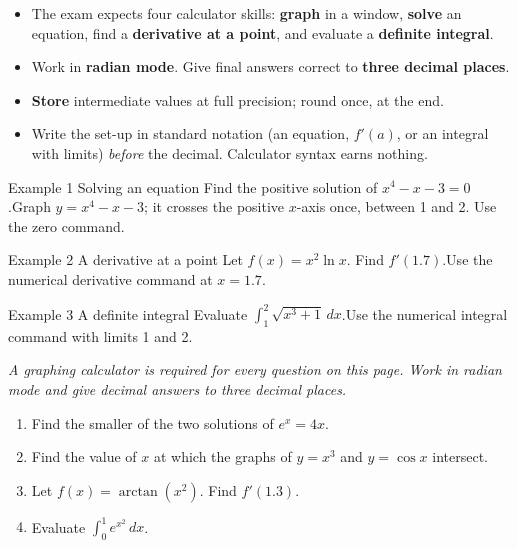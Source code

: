 \documentclass[11pt]{article}
\begin{document}

\begin{ideabox}
\begin{itemize}[leftmargin=*,itemsep=2pt,topsep=2pt]
  \item The exam expects four calculator skills: \textbf{graph} in a window, \textbf{solve} an equation, find a \textbf{derivative at a point}, and evaluate a \textbf{definite integral}.
  \item Work in \textbf{radian mode}. Give final answers correct to \textbf{three decimal places}.
  \item \textbf{Store} intermediate values at full precision; round once, at the end.
  \item Write the set-up in standard notation (an equation, $f'(a)$, or an integral with limits) \emph{before} the decimal. Calculator syntax earns nothing.
\end{itemize}
\end{ideabox}

\begin{example}{Example 1 \textperiodcentered{} Solving an equation}
Find the positive solution of $x^4-x-3=0$.\soln Graph $y=x^4-x-3$; it crosses the positive $x$-axis once, between 1 and 2. Use the zero command.
\end{example}

\begin{example}{Example 2 \textperiodcentered{} A derivative at a point}
Let $f(x)=x^2\ln x$. Find $f'(1.7)$.\soln Use the numerical derivative command at $x=1.7$.
\end{example}

\begin{example}{Example 3 \textperiodcentered{} A definite integral}
Evaluate $\displaystyle\int_1^2\sqrt{x^3+1}\,dx$.\soln Use the numerical integral command with limits 1 and 2.
\end{example}

\newpage
{}
\emph{A graphing calculator is required for every question on this page. Work in radian mode and give decimal answers to three decimal places.}
\begin{enumerate}[leftmargin=*,itemsep=2pt]
  \item Find the smaller of the two solutions of $e^{x}=4x$.\work{2.3cm}
  \item Find the value of $x$ at which the graphs of $y=x^3$ and $y=\cos x$ intersect.\work{2.3cm}
  \item Let $f(x)=\arctan\!\left(x^2\right)$. Find $f'(1.3)$.\work{2.3cm}
  \item Evaluate $\displaystyle\int_0^1e^{x^2}\,dx$.\work{2.3cm}
\end{enumerate}
\end{document}
